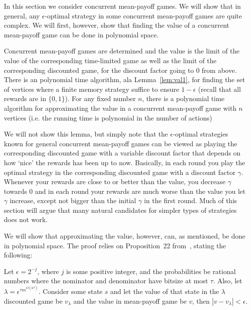 In this section we consider concurrent mean-payoff games. 
We will show that in general, any  $\epsilon$-optimal strategy in some concurrent mean-payoff games are quite complex. 
We will first, however, show that finding the value of a concurrent mean-payoff game can be done in polynomial space.

\begin{lemma}\label{lemm:class_meanpayoff}
Concurrent mean-payoff games are determined and the value is the limit of the value of the corresponding time-limited game as well as the limit of the corresponding discounted game, for the discount factor going to 0 from above.
There is an polynomial time algorithm, ala Lemma~\cref{lem:val1}, for finding the set of vertices where a finite memory strategy suffice to ensure $1-\epsilon$ (recall that all rewards are in $\{0,1\}$).
For any fixed number $n$, there is a polynomial time algorithm for approximating the value in a concurrent mean-payoff game with $n$ vertices (i.e. the running time is polynomial in the number of actions)
\end{lemma}
We will not show this lemma, but simply note that the $\epsilon$-optimal strategies known for general concurrent mean-payoff games  can be viewed as playing the corresponding discounted game with a variable discount factor that depends on how `nice' the rewards has been up to now. Basically, in each round you play the optimal strategy in the corresponding discounted game with a discount factor $\gamma$. Whenever 
 your rewards are close to or better than the value, you decrease $\gamma$ towards 0 and in each round your rewards are much worse than the value you let $\gamma$ increase, except not bigger than the initial $\gamma$ in the first round. Much of this section will argue that many natural candidates for simpler types of strategies does not work.


We will show that approximating the value, however, can, as mentioned, be done in polynomial space. The proof relies on Proposition~22 from~\cite{HKLMT:2011}, stating the following:
\begin{proposition}
Let $\epsilon=2^{-j}$, where $j$ is some positive integer, and the probabilities be rational numbers where the nominator and denominator have bitsize at most $\tau$. Also, let $\lambda=\epsilon^{\tau m^{O(n^2)}}$. Consider some state $s$ and let the value of that state in the $\lambda$ discounted game be $v_{\lambda}$ and the value in mean-payoff game be $v$, then $|v-v_{\lambda}|<\epsilon$.
\end{proposition}

